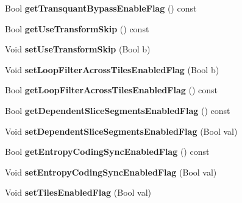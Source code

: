 \begin{DoxyCompactItemize}
\item 
\mbox{\label{class_t_com_p_p_s_a2619237726e40cf68fd9204d67c639d3}} 
Bool {\bfseries get\+Transquant\+Bypass\+Enable\+Flag} () const
\item 
\mbox{\label{class_t_com_p_p_s_af0beda52e84137cb908130322bf381db}} 
Bool {\bfseries get\+Use\+Transform\+Skip} () const
\item 
\mbox{\label{class_t_com_p_p_s_a69237dc6c8bbba6fb145c7806346feca}} 
Void {\bfseries set\+Use\+Transform\+Skip} (Bool b)
\item 
\mbox{\label{class_t_com_p_p_s_afb5487183bc9befb8f5f135df82622d8}} 
Void {\bfseries set\+Loop\+Filter\+Across\+Tiles\+Enabled\+Flag} (Bool b)
\item 
\mbox{\label{class_t_com_p_p_s_af47f9bc2ddf39f8ed49c2a59f8c3b02d}} 
Bool {\bfseries get\+Loop\+Filter\+Across\+Tiles\+Enabled\+Flag} () const
\item 
\mbox{\label{class_t_com_p_p_s_aa41afe6050fb843184b65ccebbc17dc9}} 
Bool {\bfseries get\+Dependent\+Slice\+Segments\+Enabled\+Flag} () const
\item 
\mbox{\label{class_t_com_p_p_s_ac54c58e01e7feff90ec4523cd664accd}} 
Void {\bfseries set\+Dependent\+Slice\+Segments\+Enabled\+Flag} (Bool val)
\item 
\mbox{\label{class_t_com_p_p_s_ad282c13459f07a28e09d19cf5c63df3b}} 
Bool {\bfseries get\+Entropy\+Coding\+Sync\+Enabled\+Flag} () const
\item 
\mbox{\label{class_t_com_p_p_s_a3fdded1edd91de8509f915b57c087dfb}} 
Void {\bfseries set\+Entropy\+Coding\+Sync\+Enabled\+Flag} (Bool val)
\item 
\mbox{\label{class_t_com_p_p_s_ae75185d636d2082da9030cd96f216097}} 
Void {\bfseries set\+Tiles\+Enabled\+Flag} (Bool val)
\item 
\mbox{\label{class_t_com_p_p_s_ac8c6af0aaa962ca7dd5e05a2da7008ca}} 

\end{DoxyCompactItemize}
